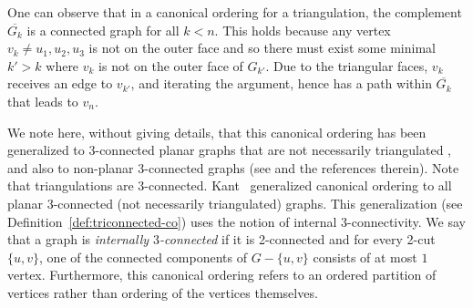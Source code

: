 \documentclass[12pt]{article}
\begin{document}
One can observe that in a canonical ordering for a triangulation, the complement $\overline{G_k}$ is a connected graph for all $k<n$. 
This holds because any vertex $v_k\neq u_1,u_2,u_3$ is not on the outer face and so there must exist some minimal $k'>k$ where $v_k$ is
not on the outer face of $G_{k'}$.  Due to the triangular faces, $v_k$ receives an edge to $v_{k'}$, and iterating the
argument, hence has a path within $\overline{G_k}$ that leads to $v_n$.

We note here, without giving details, that this canonical ordering
has been generalized to 3-connected planar graphs that are not necessarily
triangulated \cite{Kant96}, and also to non-planar
3-connected graphs (see \cite{Schmidt-ICALP14} and the references therein).
\iffalse
Note that triangulations are 3-connected. Kant~\cite{Kant96} generalized canonical ordering to all planar $3$-connected (not necessarily triangulated) graphs. 
This generalization (see Definition~\ref{def:triconnected-co}) uses the notion of internal 3-connectivity. We say that a graph is \emph{internally $3$-connected} if it is 2-connected and for every 2-cut $\{u,v\}$, one of the connected components of $G-\{u,v\}$ consists of at most $1$ vertex.  
Furthermore, this canonical ordering refers to an ordered partition of vertices rather than ordering of the vertices themselves. 
\end{document}
